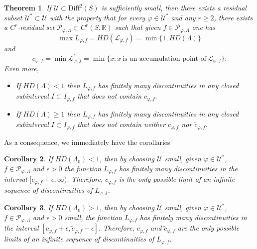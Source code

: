 \documentclass[12pt]{amsart}
\newcommand{\infinity}{\infty}
\theoremstyle{plain} %
\newtheorem{theorem}{Theorem}[section]
\newtheorem{corollary}[theorem]{Corollary}
\theoremstyle{definition} %
\numberwithin{equation}{section}
\begin{document}
\begin{theorem}\label{principal0} If $\mathcal{U}\subset\textrm{Diff}^{2}(S)$ is sufficiently small, then there exists a residual subset $\mathcal{U}^{*}\subset \mathcal{U}$ with the property that for every $\varphi\in\mathcal{U}^{*}$ and any $r\geq2$, there exists a $C^r$-residual set $\mathcal{P}_{\varphi,\Lambda}\subset C^r(S,\mathbb{R})$ such that given $f\in \mathcal{P}_{\varphi,\Lambda}$ one has
$$\max L_{\varphi, f}=HD(\mathcal{L}_{\varphi,f})=\min \{1,HD(\Lambda)\}$$ 
and 
$$c_{\varphi,f}=\min \mathcal{L}^{'} _{\varphi, f}=\min \{x: x\ \textrm{is an accumulation point of}\ \mathcal{L}_{\varphi, f}\}.$$
Even more,
\begin{itemize}
    \item If $HD(\Lambda)<1$ then $L_{\varphi, f}$ has finitely many discontinuities in any closed subinterval $I\subset I_{\varphi,f}$ that does not contain $c_{\varphi,f}.$
    \item If $HD(\Lambda)\geq 1$ then $L_{\varphi, f}$ has finitely many discontinuities in any closed subinterval $I\subset I_{\varphi,f}$ that does not contain neither $c_{\varphi,f}$ nor $\tilde{c}_{\varphi,f}.$
\end{itemize}

\end{theorem}

As a consequence, we immediately have the corollaries 
\begin{corollary}
If $HD(\Lambda_0)<1$, then by choosing $\mathcal{U}$ small, given $\varphi\in\mathcal{U}^*$, $f\in \mathcal{P}_{\varphi,\Lambda}$ and $\epsilon >0$ the function $L_{\varphi, f}$ has finitely many discontinuities in the interval $[c_{\varphi,f}+\epsilon, \infinity)$. Therefore, $c_{\varphi,f}$ is the only possible limit of an infinite sequence of discontinuities of $L_{\varphi, f}$.
\end{corollary}
\begin{corollary}
If $HD(\Lambda_0)>1$, then by choosing $\mathcal{U}$ small, given $\varphi\in\mathcal{U}^*$, $f\in \mathcal{P}_{\varphi,\Lambda}$ and $\epsilon >0$ small, the function $L_{\varphi, f}$ has finitely many discontinuities in the interval $[c_{\varphi,f}+\epsilon, \tilde{c}_{\varphi,f}-\epsilon].$ Therefore, $c_{\varphi,f}$ and $\tilde{c}_{\varphi,f}$  are the only possible limits of an infinite sequence of discontinuities of $L_{\varphi, f}$.
\end{corollary}
\end{document}
